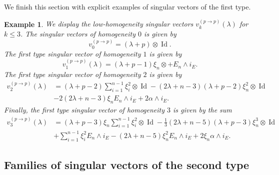 \documentclass[a4paper,12pt,reqno]{amsart}
\newtheorem{example}[theorem]{Example}
\numberwithin{theorem}{subsection}
\numberwithin{equation}{section}
\begin{document}
We finish this section with explicit examples of singular vectors of the first
type.

\begin{example}\label{ExamplesPtoP} We display the low-homogeneity singular vectors
$v_k^{(p \to p)}(\lambda)$ for $k \le 3$. The singular vectors of homogeneity
$0$ is given by
\begin{equation*}
   v_0^{(p\to p)} = (\lambda\!+\!p) \otimes {\operatorname{Id}}.
\end{equation*}
The first type singular vector of homogeneity $1$ is given by
\begin{equation*}
   v_1^{(p\to p)}(\lambda)  = (\lambda\!+\!p\!-\!1) \xi_n \otimes + E_n \wedge i_E.
\end{equation*}
The first type singular vector of homogeneity $2$ is given by
\begin{align*}
   v_2^{(p\to p)}(\lambda) & = (\lambda\!+\!p\!-\!2) \sum_{i=1}^{n-1}\xi_i^2 \otimes
   {\operatorname{Id}} -(2\lambda\!+\!n\!-\!3)(\lambda\!+\!p\!-\!2) \xi_n^2 \otimes {\operatorname{Id}} \\
   & -2(2\lambda\!+\!n\!-\!3)\xi_n E_n \wedge i_E + 2 \alpha \wedge i_E.
\end{align*}
Finally, the first type singular vector of homogeneity $3$ is given by the sum
\begin{align*}
   v_3^{(p\to p)}(\lambda) & = (\lambda\!+\!p\!-\!3)\xi_n\sum_{i=1}^{n-1}\xi_i^2 \otimes
   {\operatorname{Id}} -\tfrac 13 (2\lambda\!+\!n\!-\!5)(\lambda\!+\!p\!-\!3) \xi_n^3 \otimes {\operatorname{Id}} \\
   & + \sum_{i=1}^{n-1}\xi_i^2 E_n \wedge i_E - (2\lambda\!+\!n\!-\!5) \xi_n^2  E_n \wedge
   i_E + 2\xi_n \alpha \wedge i_E.
\end{align*}
\end{example}

\subsection{Families of singular vectors of the second type}\label{sv-type2}
\end{document}
